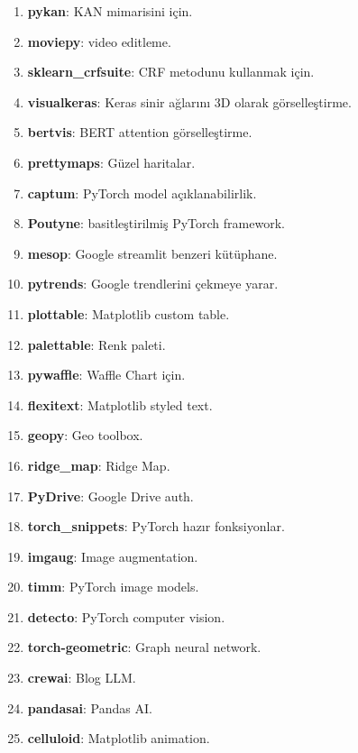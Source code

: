 \begin{enumerate}
    \item \textbf{pykan}: KAN mimarisini için.
    \item \textbf{moviepy}: video editleme.
    \item \textbf{sklearn\_crfsuite}: CRF metodunu kullanmak için.
    \item \textbf{visualkeras}: Keras sinir ağlarını 3D olarak görselleştirme.
    \item \textbf{bertvis}: BERT attention görselleştirme.
    \item \textbf{prettymaps}: Güzel haritalar.
    \item \textbf{captum}: PyTorch model açıklanabilirlik.
    \item \textbf{Poutyne}: basitleştirilmiş PyTorch framework.
    \item \textbf{mesop}: Google streamlit benzeri kütüphane.
    \item \textbf{pytrends}: Google trendlerini çekmeye yarar.
    \item \textbf{plottable}: Matplotlib custom table.
    \item \textbf{palettable}: Renk paleti.
    \item \textbf{pywaffle}: Waffle Chart için.
    \item \textbf{flexitext}: Matplotlib styled text.
    \item \textbf{geopy}: Geo toolbox.
    \item \textbf{ridge\_map}: Ridge Map.
    \item \textbf{PyDrive}: Google Drive auth.
    \item \textbf{torch\_snippets}: PyTorch hazır fonksiyonlar.
    \item \textbf{imgaug}: Image augmentation.
    \item \textbf{timm}: PyTorch image models.
    \item \textbf{detecto}: PyTorch computer vision.
    \item \textbf{torch-geometric}: Graph neural network.
    \item \textbf{crewai}: Blog LLM.
    \item \textbf{pandasai}: Pandas AI.
    \item \textbf{celluloid}: Matplotlib animation.
\end{enumerate}

